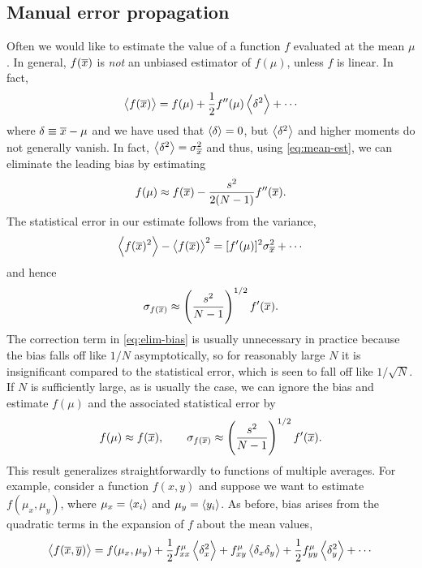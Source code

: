 \subsection{Manual error propagation}

Often we would like to estimate the value of a function $f$ evaluated at the
mean $\mu$. In general, $f(\overline{x})$ is \emph{not} an unbiased estimator of
$f(\mu)$, unless $f$ is linear. In fact,
\begin{equation}
  \av{f(\sav{x})} =
  f(\mu) +
  \frac{1}{2} f^{\prime\prime}(\mu)\av{\delta^2} +
  \cdots
  \label{eq:f-mean-expand}
\end{equation}
where $\delta \equiv \overline{x}-\mu$ and we have used that $\left< \delta \right>=0$, but
$\left< \delta^2 \right>$ and higher moments do not generally vanish. In fact,
$\left< \delta^2 \right> = \sigma_{\overline{x}}^2$ and thus, using \cref{eq:mean-est}, we can
eliminate the leading bias by estimating
\begin{equation}
  f(\mu) \approx
  f(\overline{x}) - \frac{s^2}{2(N-1)} f^{\prime\prime}(\overline{x}).
  \label{eq:elim-bias}
\end{equation}
The statistical error in our estimate follows from the variance,
\begin{equation}
  \left< f(\overline{x})^2 \right> - \left< f(\overline{x}) \right>^2 =
  [f^{\prime}(\mu)]^2 \sigma_{\overline{x}}^2 + \cdots
\end{equation}
and hence
\begin{equation}
  \sigma_{f(\overline{x})} \approx \left(\frac{s^2}{N-1}\right)^{1/2} f^{\prime}(\overline{x}).
\end{equation}
The correction term in \cref{eq:elim-bias} is usually unnecessary in practice
because the bias falls off like $1/N$ asymptotically, so for reasonably large
$N$ it is insignificant compared to the statistical error, which is seen to
fall off like $1/\sqrt{N}$. If $N$ is sufficiently large, as is usually the
case, we can ignore the bias and estimate $f(\mu)$ and the associated
statistical error by
\begin{equation}
  f(\mu) \approx f(\overline{x}),\qquad
  \sigma_{f(\overline{x})} \approx \left(\frac{s^2}{N-1}\right)^{1/2} f^{\prime}(\overline{x}).
  \label{eq:est-error-manual}
\end{equation}
This result generalizes straightforwardly to functions of multiple averages.
For example, consider a function $f(x,y)$ and suppose we want to estimate
$f(\mu_x,\mu_y)$, where $\mu_x=\left< x_i \right>$ and $\mu_y=\left< y_i \right>$.
As before, bias arises from the quadratic terms in the expansion of $f$
about the mean values,
\begin{equation}
  \left< f(\overline{x},\overline{y}) \right> =
  f(\mu_x,\mu_y) +
  \frac{1}{2} f_{x x}^{\mu} \left< \delta_x^2 \right> +
  f_{x y}^{\mu} \left< \delta_x \delta_y \right> +
  \frac{1}{2} f_{y y}^{\mu} \left< \delta_y^2 \right> + \cdots
\end{equation}
